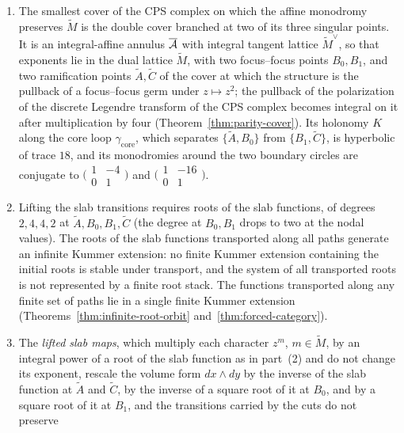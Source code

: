 \begin{maintheorem}
\label{thm:intro-reconstruction}
\begin{enumerate}
\item The smallest cover of the CPS complex on which the affine monodromy
preserves $\widetilde M$ is the double cover branched at two of its three
singular points.
It is an integral-affine annulus $\overline{\mathcal A}$ with integral
tangent lattice $\widetilde M^\vee$, so that exponents lie in the dual
lattice $\widetilde M$, with two focus--focus points $B_0,B_1$, and two
ramification points $\widetilde A,\widetilde C$ of the cover at which the
structure is the pullback of a focus--focus germ under $z\mapsto z^2$; the
pullback of the polarization of the discrete Legendre transform of the CPS
complex becomes integral on it after multiplication by four
(Theorem~\ref{thm:parity-cover}).  Its holonomy $K$ along the core loop
$\gamma_{\mathrm{core}}$, which separates $\{\widetilde A,B_0\}$ from
$\{B_1,\widetilde C\}$, is hyperbolic of trace $18$, and its monodromies around the two boundary circles are conjugate to
$\bigl(\begin{smallmatrix}1&-4\\0&1\end{smallmatrix}\bigr)$ and
$\bigl(\begin{smallmatrix}1&-16\\0&1\end{smallmatrix}\bigr)$.
\item Lifting the slab transitions requires roots of the slab functions, of
degrees $2,4,4,2$ at $\widetilde A,B_0,B_1,\widetilde C$ (the degree at
$B_0,B_1$ drops to two at the nodal values).  The roots of the slab
functions transported along all paths generate an infinite Kummer extension:
no finite Kummer extension containing the initial roots is stable under
transport, and the system of all transported roots is not represented by a
finite root stack.  The functions transported along any finite set of paths
lie in a single finite Kummer extension (Theorems~\ref{thm:infinite-root-orbit}
and~\ref{thm:forced-category}).
\item The \emph{lifted slab maps}, which multiply each character $z^m$,
$m\in\widetilde M$, by an integral power of a root of the slab function as
in part~(2) and do not change its exponent, rescale the volume form
$dx\wedge dy$ by the
inverse of the slab function at $\widetilde A$ and $\widetilde C$, by the
inverse of a square root of it at $B_0$, and by a square root of it at
$B_1$, and the transitions carried by the cuts do not preserve

\end{enumerate}
\end{maintheorem}
